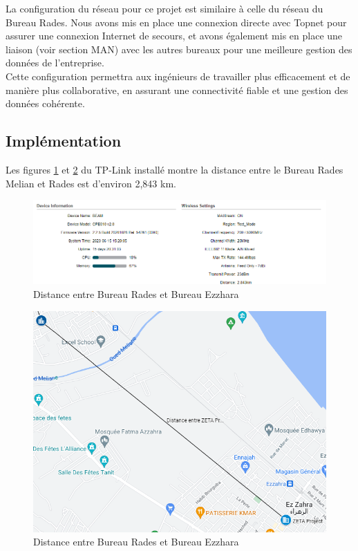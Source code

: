 La configuration du réseau pour ce projet est similaire à celle du réseau du Bureau Rades. Nous avons mis en place une connexion directe avec Topnet pour assurer une connexion Internet de secours, et avons également mis en place une liaison (voir section MAN) avec les autres bureaux pour une meilleure gestion des données de l'entreprise. \\

Cette configuration permettra aux ingénieurs de travailler plus efficacement et de manière plus collaborative, en assurant une connectivité fiable et une gestion des données cohérente. \\





\subsection{Implémentation}


Les figures \ref{Chap2.5.4} et \ref{Chap2.5.5} du TP-Link installé montre la distance entre le Bureau Rades Melian et Rades est d'environ 2,843 km.  \\ 


\begin{figure}[H]
 \centering
    \includegraphics[width=15cm]{Images/152014.png}
    \caption{Distance entre Bureau Rades et Bureau Ezzhara}
    \label{Chap2.5.4}
\end{figure}    
\smallskip

\begin{figure}[H]
 \centering
    \includegraphics[width=15cm]{Images/Distance2.png}
    \caption{Distance entre Bureau Rades et Bureau Ezzhara}
    \label{Chap2.5.5}
\end{figure}    
\smallskip



